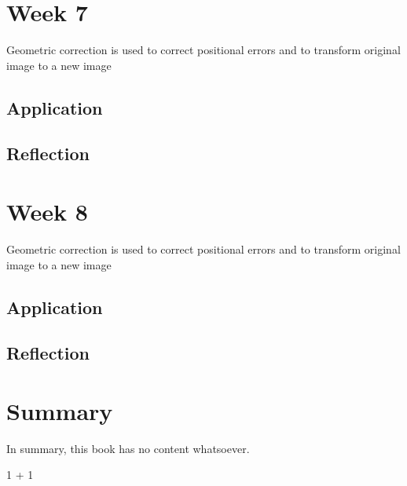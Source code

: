 \documentclass[
  letterpaper,
  DIV=11,
  numbers=noendperiod]{scrreprt}
\newenvironment{Shaded}{\begin{snugshade}}{\end{snugshade}}
\newcommand{\DecValTok}[1]{\textcolor[rgb]{0.68,0.00,0.00}{#1}}
\newcommand{\SpecialCharTok}[1]{\textcolor[rgb]{0.37,0.37,0.37}{#1}}
\begin{document}
\hypertarget{week-7}{%
\chapter{Week 7}\label{week-7}}

Geometric correction is used to correct positional errors and to
transform original image to a new image

\hypertarget{application-5}{%
\section{Application}\label{application-5}}

\hypertarget{reflection-5}{%
\section{Reflection}\label{reflection-5}}


\hypertarget{week-8}{%
\chapter{Week 8}\label{week-8}}

Geometric correction is used to correct positional errors and to
transform original image to a new image

\hypertarget{application-6}{%
\section{Application}\label{application-6}}

\hypertarget{reflection-6}{%
\section{Reflection}\label{reflection-6}}


\hypertarget{summary}{%
\chapter{Summary}\label{summary}}

In summary, this book has no content whatsoever.

\begin{Shaded}
\begin{Highlighting}[]
\DecValTok{1} \SpecialCharTok{+} \DecValTok{1}
\end{Highlighting}
\end{Shaded}
\end{document}
